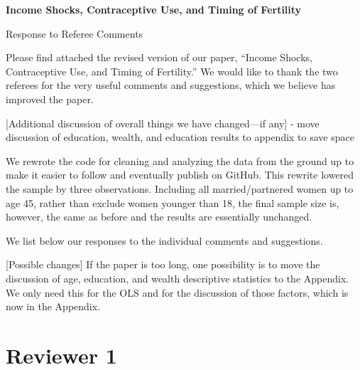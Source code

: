 \documentclass[letterpaper,12pt]{article}
\title{} \author{}
\begin{document}
\begin{center} \textbf{\large Income Shocks, Contraceptive Use, and
Timing of Fertility} \end{center}

\begin{center} Response to Referee Comments \end{center}

\noindent Please find attached the revised version of our paper,
``Income Shocks, Contraceptive Use, and Timing of Fertility.''
We would like to thank the two referees for the very useful comments and
suggestions,
which we believe has improved the paper.

[Additional discussion of overall things we have changed---if any]
- move discussion of education, wealth, and education results to appendix
to save space


We rewrote the code for cleaning and analyzing the data from the ground up 
to make it easier to follow and eventually publish on GitHub.
This rewrite lowered the sample by three observations.
Including all married/partnered women up to age 45, rather than exclude
women younger than 18, the final sample size is, however, the same as 
before and the results are essentially unchanged.

We list below our responses to the individual comments and suggestions.

[Possible changes]
If the paper is too long, one possibility is to move the discussion of
age, education, and wealth descriptive statistics to the Appendix.
We only need this for the OLS and for the discussion of those factors,
which is now in the Appendix. 

\newpage

\section*{Reviewer 1}

\end{document}
